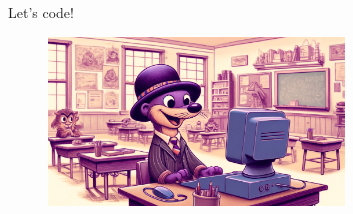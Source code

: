 \documentclass[aspectratio=169, 8pt, xcolor={svgnames}, hyperref={linkcolor=black}]{beamer}
\begin{document}
\begin{frame}
\centering
\Huge Let's code!
\begin{figure}
   \includegraphics[width=0.7\textwidth]{figures/hands_on.png}
\end{figure}
\end{frame}
\end{document}
